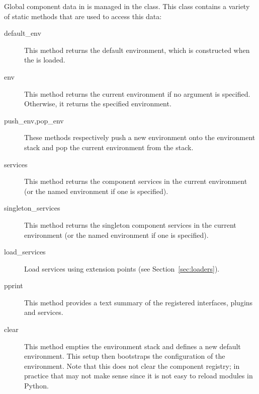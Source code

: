 Global component data in \pcasp is managed in the  class. This
class contains a variety of static methods that are used to access
this data:
\begin{description}
\item[default\_env] This method returns the default environment, which is constructed when the \pcasp is loaded. 
\item[env] This method returns the current environment if no argument is specified. Otherwise, it returns the specified environment. 
\item[push\_env,pop\_env] These methods respectively push a new environment onto the environment stack and pop the current environment from the stack. 
\item[services] This method returns the component services in the current environment (or the named environment if one is specified). 
\item[singleton\_services] This method returns the singleton component services in the current environment (or the named environment if one is specified). 
\item[load\_services] Load services using  extension points (see Section~\ref{sec:loaders}). 
\item[pprint] This method provides a text summary of the registered interfaces, plugins and services. 
\item[clear] This method empties the environment stack and defines a new default environment. This setup then bootstraps the configuration of the  environment. Note that this does not clear the component registry; in practice that may not make sense since it is not easy to reload modules in Python. 
\end{description}




